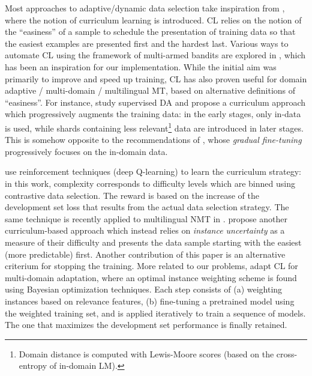 \documentclass[11pt]{article}
\newcommand{\fyDone}[1]{\done[FY]\Todo[FY:]{\textcolor{orange}{#1}}}
\begin{document}
Most approaches to adaptive/dynamic data selection take inspiration from \citet{Bengio09curriculum}, where the notion of curriculum learning is introduced. CL relies on the notion of the ``easiness'' of a sample to schedule the presentation of training data so that the easiest examples are presented first and the hardest last. Various ways to automate CL using the framework of multi-armed bandits are explored in \citep{Graves17automated}, which has been an inspiration for our implementation. While the initial aim was primarily to improve and speed up training, CL has also proven useful for domain adaptive / multi-domain / multilingual MT, based on alternative definitions of ``easiness''.\fyDone{Ajouter Grave}
For instance, \citet{Zhang19curriculum} study supervised DA and propose a curriculum approach which progressively augments the training data: in the early stages, only in-data is used, while shards containing less relevant\footnote{Domain distance is computed with Lewis-Moore scores (based on the cross-entropy of in-domain LM).} data are introduced in later stages. This is somehow opposite to the recommendations of \citet{Vanderwees17dynamic}, whose \emph{gradual fine-tuning} progressively focuses on the in-domain data.\fyDone{These have not been compared? and also to what we do ?} 

\citet{Kumar19reinforcement} use reinforcement techniques (deep Q-learning) to learn the curriculum strategy: in this work, complexity corresponds to difficulty levels which are binned using contrastive data selection. The reward is based on the increase of the development set loss that results from the actual data selection strategy.\fyDone{Alert: what do we do during warm-up ?} The same technique is recently applied to multilingual NMT in \citep{Kumar21learning}. \citet{Zhou20uncertainty} propose another curriculum-based approach which instead relies on \emph{instance uncertainty} as a measure of their difficulty and presents the data sample starting with the easiest (more predictable) first. Another contribution of this paper is an alternative criterium for stopping the training. More related to our problems, \citet{Wang20learning-multi} adapt CL for multi-domain adaptation, where an optimal instance weighting scheme is found using Bayesian optimization techniques. Each step consists of (a) weighting instances based on relevance features, (b) fine-tuning a pretrained model using the weighted training set, and is applied iteratively to train a sequence of models. The one that maximizes the development set performance is finally retained.
\end{document}
